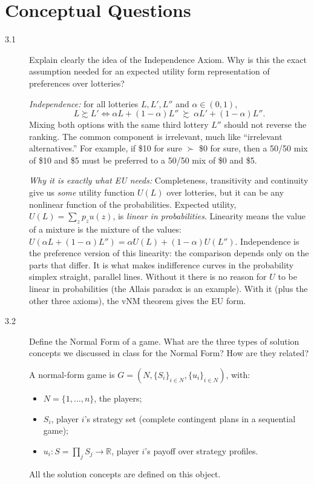 \section{Conceptual Questions}

\begin{description}
\item[3.1] Explain clearly the idea of the Independence Axiom. Why is this the exact assumption needed for an expected utility form representation of preferences over lotteries?
\begin{solution}
\emph{Independence:} for all lotteries $L,L',L''$ and $\alpha\in(0,1)$,
\[L\succsim L' \iff \alpha L+(1-\alpha)L''\ \succsim\ \alpha L'+(1-\alpha)L''.\]
Mixing both options with the same third lottery $L''$ should not reverse the ranking. The common component is irrelevant, much like ``irrelevant alternatives.'' For example, if \$10 for sure $\succ$ \$0 for sure, then a 50/50 mix of \$10 and \$5 must be preferred to a 50/50 mix of \$0 and \$5.

\emph{Why it is exactly what EU needs:} Completeness, transitivity and continuity give us \emph{some} utility function $U(L)$ over lotteries, but it can be any nonlinear function of the probabilities. Expected utility, $U(L)=\sum_z p_z u(z)$, is \emph{linear in probabilities}. Linearity means the value of a mixture is the mixture of the values: $U(\alpha L+(1-\alpha)L'')=\alpha U(L)+(1-\alpha)U(L'')$. Independence is the preference version of this linearity: the comparison depends only on the parts that differ. It is what makes indifference curves in the probability simplex straight, parallel lines. Without it there is no reason for $U$ to be linear in probabilities (the Allais paradox is an example). With it (plus the other three axioms), the vNM theorem gives the EU form.
\end{solution}
\item[3.2] Define the Normal Form of a game. What are the three types of solution concepts we discussed in class for the Normal Form? How are they related?
\begin{solution}
A normal-form game is $G=(N,\{S_i\}_{i\in N},\{u_i\}_{i\in N})$, with:
\begin{itemize}[nosep]
\item $N=\{1,\dots,n\}$, the players;
\item $S_i$, player $i$'s strategy set (complete contingent plans in a sequential game);
\item $u_i:S=\prod_j S_j\to\mathbb{R}$, player $i$'s payoff over strategy profiles.
\end{itemize}
All the solution concepts are defined on this object.


\end{solution}
\end{description}
